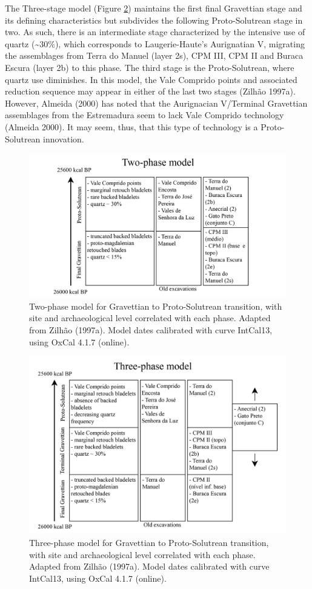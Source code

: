 \documentclass[12pt,twoside]{reedthesis}
\begin{document}
The Three-stage model (Figure \ref{fig:threephase}) maintains the first final Gravettian stage and its defining characteristics but subdivides the following Proto-Solutrean stage in two. As such, there is an intermediate stage characterized by the intensive use of quartz (\textasciitilde30\%), which corresponds to Laugerie-Haute's Aurignatian V, migrating the assemblages from Terra do Manuel (layer 2s), CPM III, CPM II and Buraca Escura (layer 2b) to this phase. The third stage is the Proto-Solutrean, where quartz use diminishes. In this model, the Vale Comprido points and associated reduction sequence may appear in either of the last two stages (Zilhão 1997a). However, Almeida (2000) has noted that the Aurignacian V/Terminal Gravettian assemblages from the Estremadura seem to lack Vale Comprido technology (Almeida 2000). It may seem, thus, that this type of technology is a Proto-Solutrean innovation.
\begin{figure}[H]

{\centering \includegraphics[width=0.7\linewidth]{figure/Two-phasemodel} 

}

\caption{Two-phase model for Gravettian to Proto-Solutrean transition, with site and archaeological level correlated with each phase. Adapted from Zilhão (1997a). Model dates calibrated with curve IntCal13, using OxCal 4.1.7 (online).}\label{fig:twophase}
\end{figure}
\begin{figure}[H]

{\centering \includegraphics[width=0.7\linewidth]{figure/Three-phasemodel} 

}

\caption{Three-phase model for Gravettian to Proto-Solutrean transition, with site and archaeological level correlated with each phase. Adapted from Zilhão (1997a). Model dates calibrated with curve IntCal13, using OxCal 4.1.7 (online).}\label{fig:threephase}
\end{figure}
~
\end{document}
